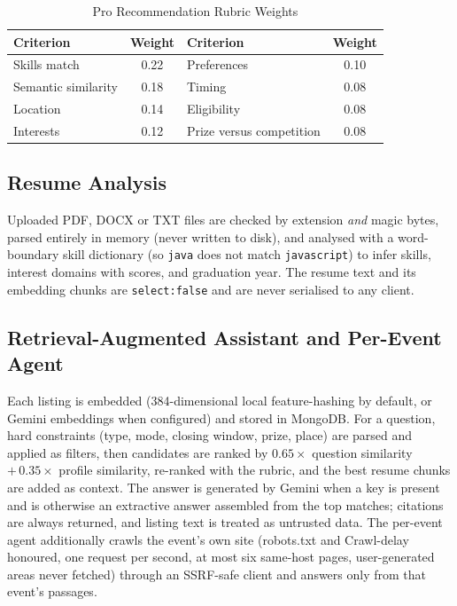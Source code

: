 \documentclass[12pt,a4paper]{report}
\begin{document}
\begin{table}[H]
\centering
\caption{Pro Recommendation Rubric Weights}
\label{tab:rubric}
\begin{tabular}{|l|c|l|c|}
\hline
\textbf{Criterion} & \textbf{Weight} & \textbf{Criterion} & \textbf{Weight} \\
\hline
Skills match & 0.22 & Preferences & 0.10 \\
\hline
Semantic similarity & 0.18 & Timing & 0.08 \\
\hline
Location & 0.14 & Eligibility & 0.08 \\
\hline
Interests & 0.12 & Prize versus competition & 0.08 \\
\hline
\end{tabular}
\end{table}

\subsection{Resume Analysis}
Uploaded PDF, DOCX or TXT files are checked by extension \emph{and} magic bytes, parsed entirely in memory (never written to disk), and analysed with a word-boundary skill dictionary (so \texttt{java} does not match \texttt{javascript}) to infer skills, interest domains with scores, and graduation year. The resume text and its embedding chunks are \texttt{select:false} and are never serialised to any client.

\subsection{Retrieval-Augmented Assistant and Per-Event Agent}
Each listing is embedded (384-dimensional local feature-hashing by default, or Gemini embeddings when configured) and stored in MongoDB. For a question, hard constraints (type, mode, closing window, prize, place) are parsed and applied as filters, then candidates are ranked by $0.65\times$ question similarity $+\,0.35\times$ profile similarity, re-ranked with the rubric, and the best resume chunks are added as context. The answer is generated by Gemini when a key is present and is otherwise an extractive answer assembled from the top matches; citations are always returned, and listing text is treated as untrusted data. The per-event agent additionally crawls the event's own site (robots.txt and Crawl-delay honoured, one request per second, at most six same-host pages, user-generated areas never fetched) through an SSRF-safe client and answers only from that event's passages.
\end{document}
